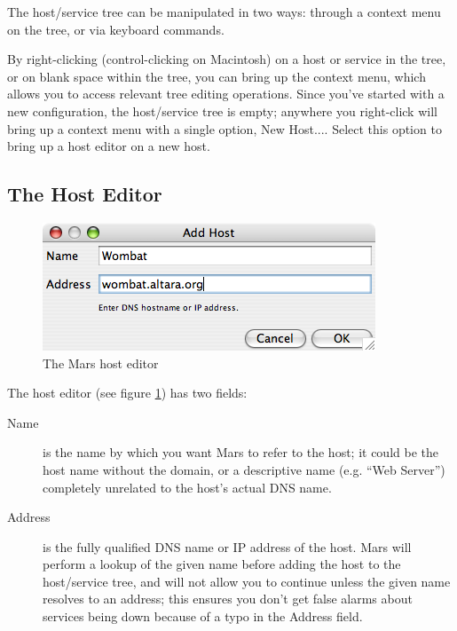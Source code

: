 \documentclass{article}
\newcommand{\guiitem}[1]{{\sf #1}}
\begin{document}
The host/service tree can be manipulated in two ways: through a
context menu on the tree, or via keyboard commands.

By right-clicking (control-clicking on Macintosh) on a host or
service in the tree, or on blank space within the tree, you can bring
up the context menu, which allows you to access relevant tree editing
operations. Since you've started with a new configuration, the
host/service tree is empty; anywhere you right-click will bring up a
context menu with a single option, \guiitem{New Host...}. Select this
option to bring up a host editor on a new host.

\subsection{The Host Editor}
\begin{figure}
\begin{center}
\includegraphics[scale=0.5]{images/screen_newhost}
\end{center}
\caption{The Mars host editor}
\label{fig_screen_newhost}
\end{figure} 

The host editor (see figure \ref{fig_screen_newhost}) has two fields:

\begin{description}
\item[Name] is the name by which you want Mars to refer to the host;
  it could be the host name without the domain, or a descriptive name
  (e.g. ``Web Server'') completely unrelated to the host's actual DNS
  name.
\item[Address] is the fully qualified DNS name or IP address of the
  host.  Mars will perform a lookup of the given name before adding
  the host to the host/service tree, and will not allow you to
  continue unless the given name resolves to an address; this ensures
  you don't get false alarms about services being down because of a
  typo in the \guiitem{Address} field.
\end{description}	
\end{document}

